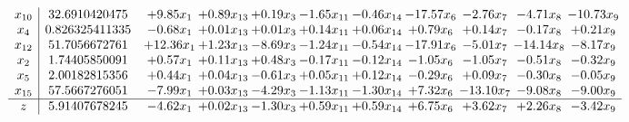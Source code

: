 \documentclass[9pt]{article}
\begin{document}
\[\begin{array}{c| c c@{\hskip 2pt} c@{\hskip 2pt} c@{\hskip 2pt} c@{\hskip 2pt} c@{\hskip 2pt} c@{\hskip 2pt} c@{\hskip 2pt} c@{\hskip 2pt} c@{\hskip 2pt} }
 x_{10}   &  32.6910420475 & +  9.85 x_{1} & +  0.89 x_{13} & +  0.19 x_{3} & -1.65 x_{11} & -0.46 x_{14} & -17.57 x_{6} & -2.76 x_{7} & -4.71 x_{8} & -10.73 x_{9}\\
 x_{4}   &  0.826325411335 & -0.68 x_{1} & +  0.01 x_{13} & +  0.01 x_{3} & +  0.14 x_{11} & +  0.06 x_{14} & +  0.79 x_{6} & +  0.14 x_{7} & -0.17 x_{8} & +  0.21 x_{9}\\
 x_{12}   &  51.7056672761 & + 12.36 x_{1} & +  1.23 x_{13} & -8.69 x_{3} & -1.24 x_{11} & -0.54 x_{14} & -17.91 x_{6} & -5.01 x_{7} & -14.14 x_{8} & -8.17 x_{9}\\
 x_{2}   &  1.74405850091 & +  0.57 x_{1} & +  0.11 x_{13} & +  0.48 x_{3} & -0.17 x_{11} & -0.12 x_{14} & -1.05 x_{6} & -1.05 x_{7} & -0.51 x_{8} & -0.32 x_{9}\\
 x_{5}   &  2.00182815356 & +  0.44 x_{1} & +  0.04 x_{13} & -0.61 x_{3} & +  0.05 x_{11} & +  0.12 x_{14} & -0.29 x_{6} & +  0.09 x_{7} & -0.30 x_{8} & -0.05 x_{9}\\
 x_{15}   &  57.5667276051 & -7.99 x_{1} & +  0.03 x_{13} & -4.29 x_{3} & -1.13 x_{11} & -1.30 x_{14} & +  7.32 x_{6} & -13.10 x_{7} & -9.08 x_{8} & -9.00 x_{9}\\
\hline
z    &  5.91407678245 & -4.62 x_{1} & +  0.02 x_{13} & -1.30 x_{3} & +  0.59 x_{11} & +  0.59 x_{14} & +  6.75 x_{6} & +  3.62 x_{7} & +  2.26 x_{8} & -3.42 x_{9}\\
\end{array}\]
\end{document}

